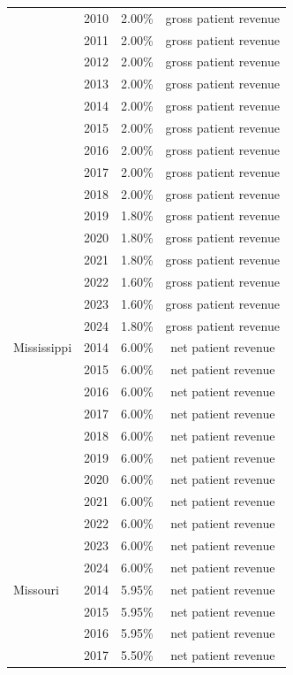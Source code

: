 \begin{longtable}{llcc}
 & 2010 & 2.00\% & gross patient revenue \\[0pt]
 & 2011 & 2.00\% & gross patient revenue \\[0pt]
 & 2012 & 2.00\% & gross patient revenue \\[0pt]
 & 2013 & 2.00\% & gross patient revenue \\[0pt]
 & 2014 & 2.00\% & gross patient revenue \\[0pt]
 & 2015 & 2.00\% & gross patient revenue \\[0pt]
 & 2016 & 2.00\% & gross patient revenue \\[0pt]
 & 2017 & 2.00\% & gross patient revenue \\[0pt]
 & 2018 & 2.00\% & gross patient revenue \\[0pt]
 & 2019 & 1.80\% & gross patient revenue \\[0pt]
 & 2020 & 1.80\% & gross patient revenue \\[0pt]
 & 2021 & 1.80\% & gross patient revenue \\[0pt]
 & 2022 & 1.60\% & gross patient revenue \\[0pt]
 & 2023 & 1.60\% & gross patient revenue \\[0pt]
 & 2024 & 1.80\% & gross patient revenue \\[0pt]
\midrule
Mississippi & 2014 & 6.00\% & net patient revenue \\[0pt]
 & 2015 & 6.00\% & net patient revenue \\[0pt]
 & 2016 & 6.00\% & net patient revenue \\[0pt]
 & 2017 & 6.00\% & net patient revenue \\[0pt]
 & 2018 & 6.00\% & net patient revenue \\[0pt]
 & 2019 & 6.00\% & net patient revenue \\[0pt]
 & 2020 & 6.00\% & net patient revenue \\[0pt]
 & 2021 & 6.00\% & net patient revenue \\[0pt]
 & 2022 & 6.00\% & net patient revenue \\[0pt]
 & 2023 & 6.00\% & net patient revenue \\[0pt]
 & 2024 & 6.00\% & net patient revenue \\[0pt]
\midrule
Missouri & 2014 & 5.95\% & net patient revenue \\[0pt]
 & 2015 & 5.95\% & net patient revenue \\[0pt]
 & 2016 & 5.95\% & net patient revenue \\[0pt]
 & 2017 & 5.50\% & net patient revenue \\[0pt]

\end{longtable}
